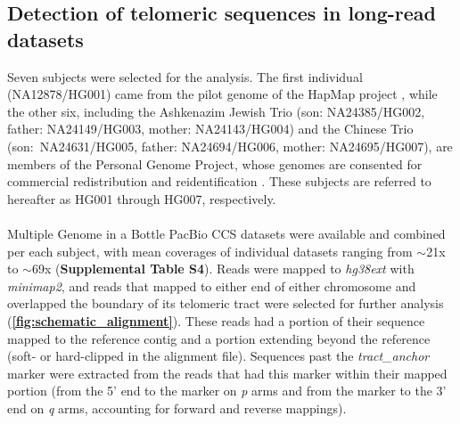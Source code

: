 \documentclass{article}
\begin{document}
\subsection*{Detection of telomeric sequences in long-read datasets}
    Seven subjects were selected for the analysis.
    The first individual (NA12878/HG001) came from the pilot genome of the HapMap project \cite{HG001},
    while the other six,
        including
            the Ashkenazim Jewish Trio (son: NA24385/HG002, father: NA24149/HG003, mother: NA24143/HG004)
            and the Chinese Trio \\%
            (\mbox{son: NA24631/HG005}, father: NA24694/HG006, mother: NA24695/HG007),
        are members of the Personal Genome Project,
            whose genomes are consented for commercial redistribution and reidentification \cite{HG00X}.
    These subjects are referred to hereafter as HG001 through HG007, respectively.
    \\~\\
    Multiple Genome in a Bottle \cite{giab} PacBio CCS \cite{pacbio,pacbioccs} datasets were available and combined per each subject,
        with mean coverages of individual datasets ranging from $\sim$21x to $\sim$69x (\textbf{Supplemental Table S4}).
    Reads were mapped to \textit{hg38ext} with \textit{minimap2},
        and reads that mapped to either end of either chromosome and overlapped the boundary of its telomeric tract
        were selected for further analysis (\textbf{\autoref{fig:schematic_alignment}}).
    These reads had a portion of their sequence mapped to the reference contig and a portion extending beyond the reference
        (soft- or hard-clipped in the alignment file).
    Sequences past the \textit{tract\_anchor} marker were extracted from the reads that had this marker within their mapped portion
        (from the 5' end to the marker on \textit{p} arms and from the marker to the 3' end on \textit{q} arms,
        accounting for forward and reverse mappings).
\end{document}
